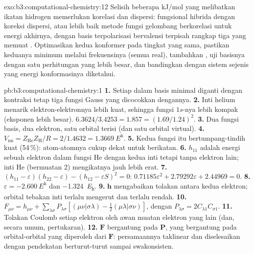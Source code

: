 \begin{solution}{exo:b3:computational-chemistry:12}
Selisih beberapa \unit{kJ/mol} yang melibatkan ikatan hidrogen memerlukan
korelasi dan dispersi: fungsional hibrida dengan koreksi dispersi, atau lebih
baik metode fungsi gelombang berkorelasi untuk energi akhirnya, dengan basis
terpolarisasi bervalensi terpisah rangkap tiga yang memuat .
Optimasikan kedua konformer pada tingkat yang sama, pastikan keduanya
minimum melalui frekuensinya (semua real), tambahkan , uji
basisnya dengan satu perhitungan yang lebih besar, dan bandingkan dengan
sistem sejenis yang energi konformasinya diketahui.
\end{solution}

\begin{solution}{pb:b3:computational-chemistry:1}
\textbf{1.} Setiap  dalam basis minimal diganti dengan
kontraksi tetap tiga fungsi Gauss yang dicocokkan dengannya.
\textbf{2.} Inti helium menarik elektron-elektronnya lebih kuat, sehingga
fungsi $1s$-nya lebih kompak (eksponen lebih besar).
$6.3624/3.4253 = 1.857 = (1.69/1.24)^2$.
\textbf{3.} Dua fungsi basis, dua elektron, satu orbital terisi (dan satu
orbital virtual).
\textbf{4.} $V_{\mathrm{nn}} = Z_{\mathrm{He}}Z_{\mathrm H}/R = 2/1.4632 =
\qty{1.3669}{\hartree}$.
\textbf{5.} Kedua fungsi itu bertumpang-tindih kuat (54\,\%): atom-atomnya
cukup dekat untuk berikatan.
\textbf{6.} $h_{11}$ adalah energi sebuah elektron dalam fungsi He dengan
kedua inti tetapi tanpa elektron lain; inti He (bermuatan 2) mengikatnya jauh
lebih erat.
\textbf{7.} $(h_{11} - \varepsilon)(h_{22} - \varepsilon) - (h_{12} - \varepsilon S)^2 = 0$:
$0.71185\varepsilon^2 + 2.79292\varepsilon + 2.44969 = 0$.
\textbf{8.} $\varepsilon = \qty{-2.600}{\hartree}$ dan \qty{-1.324}{\hartree}.
\textbf{9.} $\mathbf h$ mengabaikan tolakan antara kedua elektron; orbital
tebakan inti terlalu mengerut dan terlalu rendah.
\textbf{10.} $F_{\mu\nu} = h_{\mu\nu} + \sum_{\lambda\sigma}P_{\lambda\sigma}[(\mu\nu|\sigma\lambda) -
\frac12(\mu\lambda|\sigma\nu)]$, dengan $P_{\lambda\sigma} = 2C_{\lambda1}C_{\sigma1}$.
\textbf{11.} Tolakan Coulomb setiap elektron oleh awan muatan elektron yang
lain (dan, secara umum, pertukaran).
\textbf{12.} $\mathbf F$ bergantung pada $\mathbf P$, yang bergantung pada
orbital-orbital yang diperoleh dari $\mathbf F$: persamaannya taklinear dan
diselesaikan dengan pendekatan berturut-turut sampai swakonsisten.

\end{solution}
